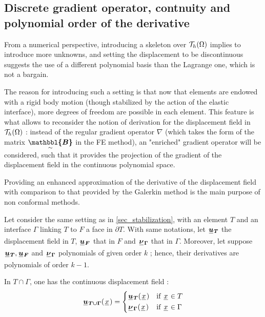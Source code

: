 \documentclass[fleqn]{article}
\begin{document}
        \subsection{Discrete gradient operator, contnuity and polynomial order of the derivative}

            From a numerical perspective, introducing a skeleton over $\mathcal{T}_h(\Omega)$ implies to introduce more unknowns, and setting the displacement to be discontinuous suggests the use of a different polynomial basis than the Lagrange one, which is not a bargain.

            The reason for introducing such a setting is that now that elements are endowed with a rigid body motion (though stabilized by the action of the elastic interface), more degrees of freedom are possible in each element. This feature is what allows to reconsider the notion of derivation for the displacement field in $\mathcal{T}_h(\Omega)$ : instead of the regular gradient operator $\nabla$ (which takes the form of the matrix $\tensorii{\mathbbl{B}}$ in the FE method), an "enriched" gradient operator will be considered, such that it provides the projection of the gradient of the displacement field in the continuous polynomial space.

            Providing an enhanced approximation of the derivative of the displacement field with comparison to that provided by the Galerkin method is the main purpose of non conformal methods.

            Let consider the same setting as in \ref{sec_stabilization}, with an element $T$ and an interface $\Gamma$ linking $T$ to $F$ a face in $\partial T$. With same notations, let $\tensori{u}\subscript{\bm{T}}$ the displacement field in $T$, $\tensori{u}\subscript{\bm{F}}$ that in $F$ and $\tensori{\nu}\subscript{\bm{\Gamma}}$ that in $\Gamma$. Moreover, let suppose $\tensori{u}\subscript{\bm{T}}, \tensori{u}\subscript{\bm{F}}$ and $\tensori{\nu}\subscript{\bm{\Gamma}}$ polynomials of given order $k$ ; hence, their derivatives  are polynomials of order $k-1$.

            In $T \cap \Gamma$, one has the continuous displacement field :
            \begin{equation}
                \tensori{u}\subscript{\bm{T \cup \Gamma}}(\lighttensori{x}) = 
                \begin{cases}
                    \tensori{u}\subscript{\bm{T}}(\lighttensori{x}) & \mbox{if } \lighttensori{x} \in T
                    \\
                    \tensori{\nu}\subscript{\bm{\Gamma}}(\lighttensori{x}) & \mbox{if } \lighttensori{x} \in \Gamma
                \end{cases}
            \end{equation}
\end{document}
